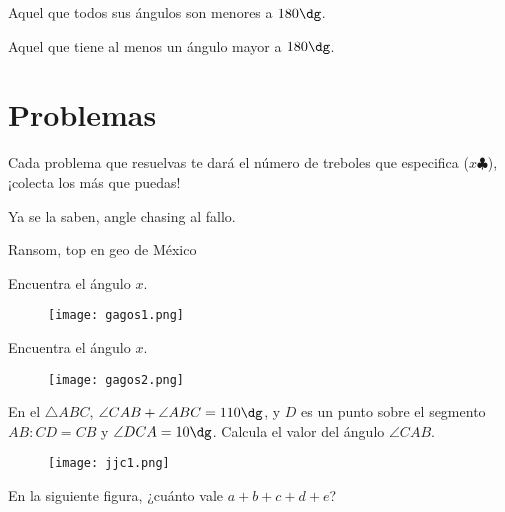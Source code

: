 \begin{definition}
    Aquel que todos sus ángulos son menores a $180 \dg$.
\end{definition}

\begin{definition}
    Aquel que tiene al menos un ángulo mayor a $180 \dg$.
\end{definition}

\newpage

\section{Problemas}

Cada problema que resuelvas te dará el número de treboles 
que especifica ($x \clubsuit$), ¡colecta los más que puedas!

\epigraph{Ya se la saben, angle chasing al fallo.}{Ransom, top en geo de México}

\begin{problem}
    Encuentra el ángulo $x$.    
\end{problem}

\begin{figure}[!h]
    \centering
    \texttt{[image: gagos1.png]}
\end{figure}

\begin{problem}
    Encuentra el ángulo $x$.    
\end{problem}

\begin{figure}[!h]
    \centering
    \texttt{[image: gagos2.png]}
\end{figure}

\begin{problem}[$2 \clubsuit$]
    En el $\triangle ABC$, $\angle CAB + \angle ABC = 110 \dg$, y 
    $D$ es un punto sobre el segmento  $AB: CD = CB$ y $\angle DCA 
    = 10 \dg$. Calcula el valor del ángulo $\angle CAB$.
\end{problem}

\begin{figure}[!h]
    \centering
    \texttt{[image: jjc1.png]}
\end{figure}

\begin{sproblem}[$3 \clubsuit$]
    En la siguiente figura, ¿cuánto vale $a+b+c+d+e$?
\end{sproblem}

